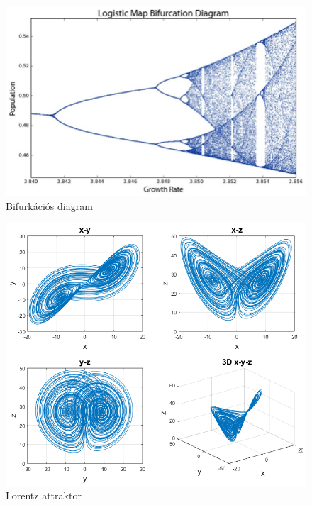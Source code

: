 \begin{figure}[!h]
	\centering
	\includegraphics[scale=0.3]{images/kep2}
	\caption{Bifurk\'aci\'os diagram}
\end{figure}



\begin{figure}[!h]
	\centering
	\includegraphics[scale=0.4]{images/kep33}
	\caption{Lorentz attraktor}
\end{figure}